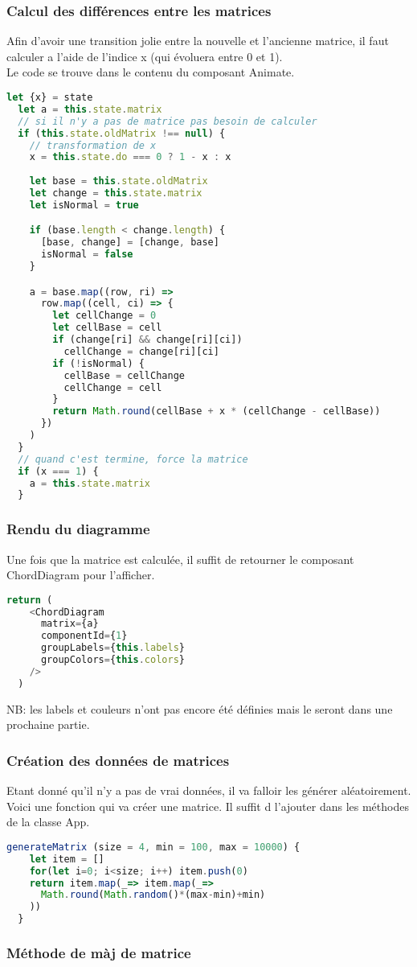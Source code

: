 \documentclass[a4paper, french, 12pt]{extarticle}
\begin{document}
\subsubsection{Calcul des différences entre les matrices}
Afin d'avoir une transition jolie entre la nouvelle et l'ancienne matrice, il faut calculer a l'aide de l'indice x (qui évoluera entre 0 et 1).\\
Le code se trouve dans le contenu du composant Animate. 
\begin{lstlisting}[language=JavaScript]
  let {x} = state
  let a = this.state.matrix
  // si il n'y a pas de matrice pas besoin de calculer
  if (this.state.oldMatrix !== null) {
    // transformation de x
    x = this.state.do === 0 ? 1 - x : x
    
    let base = this.state.oldMatrix
    let change = this.state.matrix
    let isNormal = true

    if (base.length < change.length) {
      [base, change] = [change, base]
      isNormal = false
    }

    a = base.map((row, ri) =>
      row.map((cell, ci) => {
        let cellChange = 0
        let cellBase = cell
        if (change[ri] && change[ri][ci])
          cellChange = change[ri][ci]
        if (!isNormal) {
          cellBase = cellChange
          cellChange = cell
        }
        return Math.round(cellBase + x * (cellChange - cellBase))
      })
    )
  }
  // quand c'est termine, force la matrice
  if (x === 1) {
    a = this.state.matrix
  }
\end{lstlisting}
\pagebreak
\subsubsection{Rendu du diagramme}
Une fois que la matrice est calculée, il suffit de retourner le composant ChordDiagram pour l'afficher.
\begin{lstlisting}[language=JavaScript]
  return (
    <ChordDiagram
      matrix={a}
      componentId={1}
      groupLabels={this.labels}
      groupColors={this.colors}
    />
  )
\end{lstlisting}
NB: les labels et couleurs n'ont pas encore été définies mais le seront dans une prochaine partie.

\subsubsection{Création des données de matrices}
Etant donné qu'il n'y a pas de vrai données, il va falloir les générer aléatoirement. Voici une fonction qui va créer une matrice. Il suffit d l'ajouter dans les méthodes de la classe App.
\begin{lstlisting}[language=JavaScript]
  generateMatrix (size = 4, min = 100, max = 10000) {
    let item = []
    for(let i=0; i<size; i++) item.push(0)
    return item.map(_=> item.map(_=>
      Math.round(Math.random()*(max-min)+min)
    ))
  }
\end{lstlisting}

\subsubsection{Méthode de màj de matrice}
\end{document}
